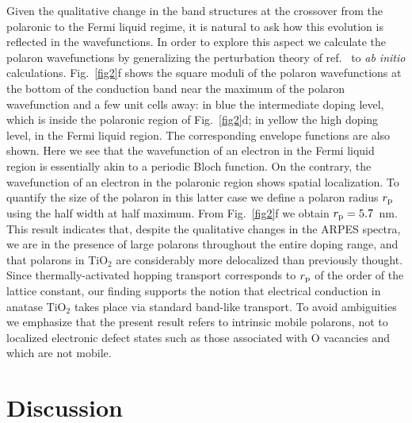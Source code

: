 \documentclass[12pt]{nature}
\begin{document}
Given the qualitative change in the band structures at the crossover from the polaronic to the Fermi 
liquid regime, it is natural to ask how this evolution is reflected in the wavefunctions. In order to 
explore this aspect we calculate the polaron wavefunctions by generalizing the perturbation theory of 
ref.~ to {\it ab initio} calculations. 
Fig.~\ref{fig2}f shows the square moduli of the polaron wavefunctions at the bottom of the conduction 
band near the maximum of the polaron wavefunction and a few unit cells away: in blue 
the intermediate doping level, which is inside the polaronic region of Fig.~\ref{fig2}d; 
in yellow the high doping level, in the Fermi liquid region. The corresponding envelope 
functions are also shown. Here we see that the 
wavefunction of an electron in the Fermi liquid region is essentially akin to a periodic Bloch function. 
On the contrary, the wavefunction of an electron in the polaronic region shows spatial localization. 
To quantify the size of the polaron in this latter case we define a polaron radius $r_{\rm p}$ using 
the half width at half maximum. From Fig.~\ref{fig2}f we obtain $r_{\rm p}=5.7$~nm. This result indicates 
that, despite the qualitative changes in the ARPES spectra, we are in the presence of large polarons 
throughout the entire doping range, and that polarons in TiO$_2$ are considerably more delocalized than
previously thought\cite{Moser2013}. Since thermally-activated hopping transport corresponds 
to $r_{\rm p}$ of the order of the lattice constant\cite{Emin}, our finding supports the 
notion that electrical conduction in anatase TiO$_2$ takes place via standard band-like transport. 
To avoid ambiguities we emphasize that the present result refers to intrinsic
mobile polarons, not to localized electronic defect states such as those associated with O vacancies
and which are not mobile\cite{Setvin2014}.

\vspace{10pt}

\section*{\textsf{Discussion}}
\end{document}
